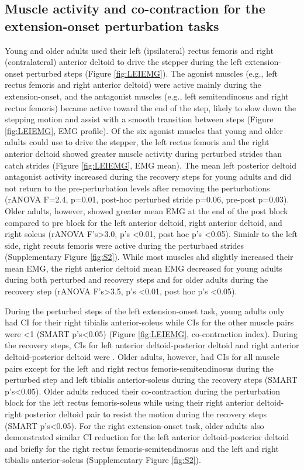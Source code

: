 \documentclass[../thesis_seyed.tex]{subfiles}
\begin{document}
\subsection{Muscle activity and co-contraction for the extension-onset perturbation tasks}
Young and older adults used their left (ipsilateral) rectus femoris and right (contralateral) anterior deltoid to drive the stepper during the left extension-onset perturbed steps (Figure \ref{fig:LEIEMG}). The agonist muscles (e.g., left rectus femoris and right anterior deltoid) were active mainly during the extension-onset, and the antagonist muscles (e.g., left semitendinosus and right rectus femoris) became active toward the end of the step, likely to slow down the stepping motion and assist with a smooth transition between steps (Figure \ref{fig:LEIEMG}, EMG profile). Of the six agonist muscles that young and older adults could use to drive the stepper, the left rectus femoris and the right anterior deltoid showed greater muscle activity during perturbed strides than catch strides (Figure \ref{fig:LEIEMG}, EMG mean). The mean left posterior deltoid antagonist activity increased during the recovery steps for young adults and did not return to the pre-perturbation levels after removing the perturbations (rANOVA F=2.4, p=0.01, post-hoc perturbed stride p=0.06, pre-post p=0.03). Older adults, however, showed greater mean EMG at the end of the post block compared to pre block for the left anterior deltoid, right anterior deltoid, and right soleus (rANOVA F's>3.0, p's <0.01, post hoc p's <0.05). Simialr to the left side, right recuts femoris were active during the perturbaed strides (Supplementary Figure \ref{fig:S2}). While most muscles ahd slightly increased their mean EMG, the right anterior deltoid mean EMG decreased for young adults during both perturbed and recovery steps and for older adults during the recovery step (rANOVA F's>3.5, p's <0.01, post hoc p's <0.05).

During the perturbed steps of the left extension-onset task, young adults only had CI  for their right tibialis anterior-soleus while CIs for the other muscle pairs were <1 (SMART p’s<0.05) (Figure \ref{fig:LEIEMG}, co-contraction index). During the recovery steps, CIs for left anterior deltoid-posterior deltoid and right anterior deltoid-posterior deltoid were . Older adults, however, had CIs  for all muscle pairs except for the left and right rectus femoris-semitendinosus during the perturbed step and left tibialis anterior-soleus during the recovery steps (SMART p’s<0.05). Older adults reduced their co-contraction during the perturbation block for the left rectus femoris-soleus while using their right anterior deltoid-right posterior deltoid pair to resist the motion during the recovery steps (SMART p’s<0.05). For the right extension-onset task, older adults also demonstrated similar CI reduction for the left anterior deltoid-posterior deltoid and briefly for the right rectus femoris-semitendinosus and the left and right tibialis anterior-soleus (Supplementary Figure \ref{fig:S2}).
\end{document}

